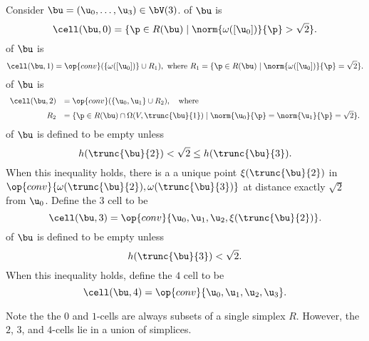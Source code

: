 \begin{definition} Consider $\bu=( \u_0,\ldots,
\u_3)\in \bV(3)$.  \hfill\break\smallskip {} of $\bu$
is
\begin{displaymath}
\cell(\bu,0) = \{\p\in R(\bu) \mid \norm{\omega([ \u_0])}{\p} > \sqrt2\}.
\end{displaymath}
\bigskip
{} of $\bu$ is 
\begin{displaymath}
\cell(\bu,1) = \op{conv}(\{\omega([ \u_0])\}\cup R_1),\hbox{ where } R_1 = \{\p \in R(\bu) \mid \norm{\omega([ \u_0])}{\p}= \sqrt2\}.
\end{displaymath}
%
%
%
\bigskip
{} of $\bu$ is
\begin{displaymath}
\begin{array}{rll}
\cell(\bu,2) &= \op{conv}( \{\u_0, \u_1\}\cup R_2),\quad\text{where }  \vspace{6pt}\\
R_2 &= \{\p \in R(\bu)\cap \Omega(V,\trunc{\bu}{1}) \mid \norm{ \u_0}{\p}=\norm{ \u_1}{\p} =\sqrt2\}.
\end{array}
\end{displaymath}
\bigskip
{} of $\bu$ is defined to be empty unless 
\begin{displaymath}
h(\trunc{\bu}{2}) <\sqrt2 \le h(\trunc{\bu}{3}).
\end{displaymath}
When this inequality holds, there is a a unique point $\xi(\trunc{\bu}{2})$ in
$\op{conv}\{\omega(\trunc{\bu}{2}),\omega(\trunc{\bu}{3})\}$ at distance exactly
$\sqrt2$ from $ \u_0$.  Define the $3$ cell to be
\begin{displaymath}
\cell(\bu,3) = \op{conv}\{ \u_0, \u_1, \u_2,\xi(\trunc{\bu}{2})\}.
\end{displaymath}
\bigskip
{} of $\bu$ is defined to be empty unless
\begin{displaymath}
h(\trunc{\bu}{3}) <\sqrt2.
\end{displaymath}
When this inequality holds, define the $4$ cell to be
\begin{displaymath}
\cell(\bu,4) = \op{conv}\{ \u_0, \u_1, \u_2, \u_3\}.
\end{displaymath}
\end{definition}
%

Note the the $0$ and $1$-cells are always subsets of a single simplex
$R$.  However, the $2$, $3$, and $4$-cells lie in a union of
simplices.


